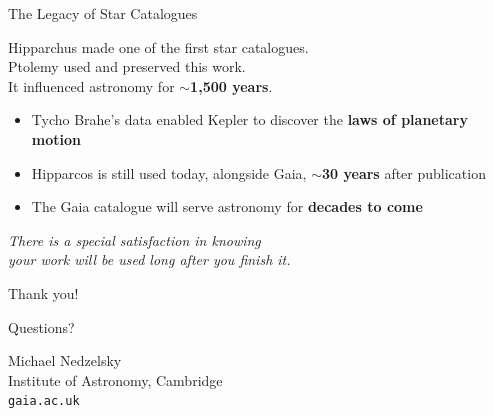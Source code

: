 \documentclass[aspectratio=169,14pt]{beamer}
\begin{document}
\begin{frame}{The Legacy of Star Catalogues}

\begin{center}
\small
Hipparchus made one of the first star catalogues.\\
Ptolemy used and preserved this work.\\
It influenced astronomy for $\sim$\textbf{1{,}500 years}.
\end{center}

\smallskip

\begin{itemize}\setlength{\itemsep}{2pt}
    \item Tycho Brahe's data enabled Kepler to discover the \textbf{laws of planetary motion}
    \item Hipparcos is still used today, alongside Gaia, $\sim$\textbf{30 years} after publication
    \item The Gaia catalogue will serve astronomy for \textbf{decades to come}
\end{itemize}

\smallskip

\begin{center}
\normalsize\itshape
There is a special satisfaction in knowing\\
your work will be used long after you finish it.
\end{center}

\end{frame}

\begin{frame}{}

\begin{center}
\Huge Thank you!

\bigskip
\Large Questions?

\bigskip
\bigskip
\normalsize
Michael Nedzelsky\\
Institute of Astronomy, Cambridge\\
\texttt{gaia.ac.uk}
\end{center}

\end{frame}
\end{document}
